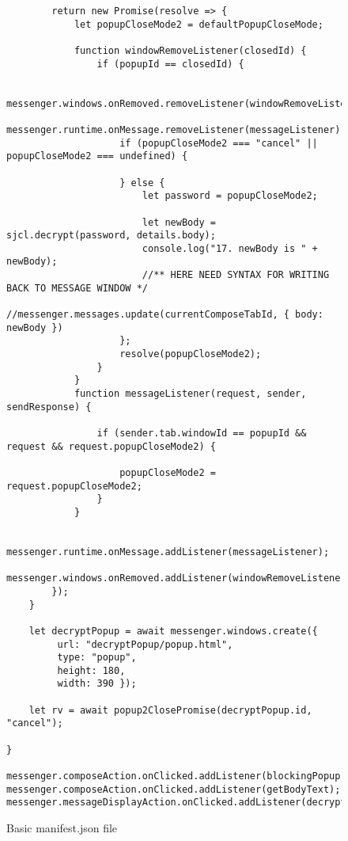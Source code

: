 \begin{figure}[H]
\begin{verbatim}
		return new Promise(resolve => {
			let popupCloseMode2 = defaultPopupCloseMode;
			
			function windowRemoveListener(closedId) {
				if (popupId == closedId) {

					messenger.windows.onRemoved.removeListener(windowRemoveListener);
					messenger.runtime.onMessage.removeListener(messageListener);
					if (popupCloseMode2 === "cancel" || popupCloseMode2 === undefined) {

					} else {
						let password = popupCloseMode2;
					
						let newBody = sjcl.decrypt(password, details.body);
						console.log("17. newBody is " + newBody);
						//** HERE NEED SYNTAX FOR WRITING BACK TO MESSAGE WINDOW */
						//messenger.messages.update(currentComposeTabId, { body: newBody })
					};
					resolve(popupCloseMode2);
				}
			}
			function messageListener(request, sender, sendResponse) {
				
				if (sender.tab.windowId == popupId && request && request.popupCloseMode2) {
					
					popupCloseMode2 = request.popupCloseMode2;
				}
			}

			messenger.runtime.onMessage.addListener(messageListener);
			messenger.windows.onRemoved.addListener(windowRemoveListener);
		});
	}
	
	let decryptPopup = await messenger.windows.create({
		 url: "decryptPopup/popup.html",
		 type: "popup",
		 height: 180,
		 width: 390 });

	let rv = await popup2ClosePromise(decryptPopup.id, "cancel");

}
	
messenger.composeAction.onClicked.addListener(blockingPopup);
messenger.composeAction.onClicked.addListener(getBodyText);
messenger.messageDisplayAction.onClicked.addListener(decryptBlockingPopup);

\end{verbatim}
\caption{\label{fig: basic_manifest.json} Basic manifest.json file}
\end{figure}